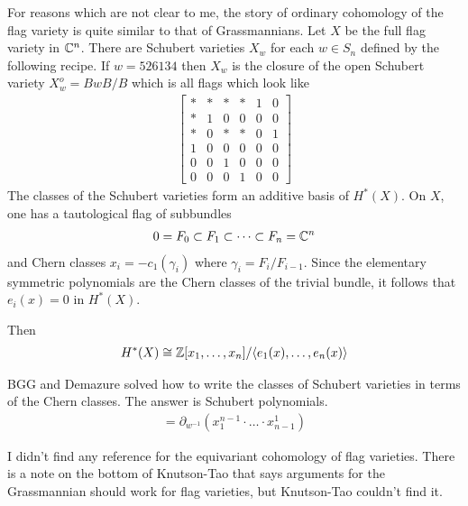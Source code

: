 \documentclass[12pt]{article}
\begin{document}
For reasons which are not clear to me, the story of ordinary cohomology of the flag variety is quite similar to that of Grassmannians.
Let $X$ be the full flag variety in $\mathbb{C}^n$. There are Schubert varieties $X_w$ for each $w\in S_n$ defined by the following recipe.
If $w = 526134$ then $X_w$ is the closure of the open Schubert variety $X_w^{o} = BwB/B$ which is all flags which look like \begin{align*}
    \begin{bmatrix}
        * & * & * & * & 1 & 0 \\
        * & 1 & 0 & 0 & 0 & 0 \\
        * & 0 & * & * & 0 & 1 \\
        1 & 0 & 0 & 0 & 0 & 0 \\
        0 & 0 & 1 & 0 & 0 & 0 \\
        0 & 0 & 0 & 1 & 0 & 0
    \end{bmatrix}
\end{align*}
The classes of the Schubert varieties form an additive basis of $H^*(X)$. On $X$, one has a tautological flag of subbundles 
\begin{align*}
    0 = F_0 \subset F_1 \subset \dots \subset F_n = \mathbb{C}^n
\end{align*} and Chern classes $x_i = -c_1(\gamma_i)$ where $\gamma_i = F_i/F_{i-1}$. 
Since the elementary symmetric polynomials are the Chern classes of the trivial bundle, it follows that $e_i(x) = 0$ in $H^*(X)$.

Then \begin{align*}
    H^*(X) \cong \mathbb{Z}[x_1,\dots,x_n]/\langle{e_1(x),\dots,e_n(x)}\rangle
\end{align*} 

\hfill 

BGG and Demazure solved how to write the classes of Schubert varieties in terms of the Chern classes. The answer is Schubert polynomials.
\begin{align*}
    [X_w] = \partial_{w^{-1}}(x_1^{n-1}\cdot \dots \cdot x_{n-1}^1)
\end{align*}

\hfill

I didn't find any reference for the equivariant cohomology of flag varieties. There is a note on the bottom of Knutson-Tao
that says arguments for the Grassmannian should work for flag varieties, but Knutson-Tao couldn't find it. 
\end{document}

